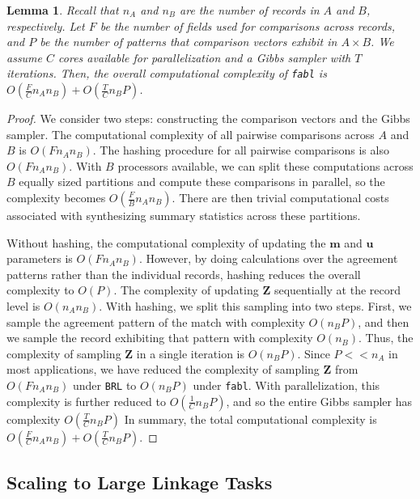 \documentclass[ba]{imsart}
\newtheorem{lemma}{Lemma}
\begin{document}
\begin{lemma}
	Recall that $n_A$ and $n_B$ are the number of records in $A$ and $B$, respectively. Let $F$ be the number of fields used for comparisons across records, and $P$ be the number of patterns that comparison vectors exhibit in $A \times B$. We assume $C$ cores available for parallelization and a Gibbs sampler with $T$ iterations. Then, the overall computational complexity of \texttt{fabl} is $O(\frac{F}{C} n_A n_B) + O(\frac{T}{C}n_B P)$.
	\label{lemma:fabl}
\end{lemma}
\begin{proof}
	We consider two steps: constructing the comparison vectors and the Gibbs sampler. The computational complexity of all pairwise comparisons across $A$ and $B$ is $O(F n_A n_B)$. The hashing procedure for all pairwise comparisons is also $O(F n_A n_B)$. With $B$ processors available, we can split these computations across $B$ equally sized partitions and compute these comparisons in parallel, so the complexity becomes $O(\frac{F}{B} n_A n_B)$. There are then trivial computational costs associated with synthesizing summary statistics across these partitions. 
	
	Without hashing, the computational complexity of updating the $\bm{m}$ and $\bm{u}$ parameters is $O(F n_A n_B)$. However, by doing calculations over the agreement patterns rather than the individual records, hashing reduces the overall complexity to $O(P)$. The complexity of updating $\bm{Z}$ sequentially at the record level is $O(n_A n_B)$. With hashing, we split this sampling into two steps. First, we sample the agreement pattern of the match with complexity $O(n_B P)$, and then we sample the record exhibiting that pattern with complexity $O(n_B)$. Thus, the complexity of sampling $\bm{Z}$ in a single iteration is $O(n_B P)$. Since $P << n_A$ in most applications, we have reduced the complexity of sampling $\bm{Z}$ from $O(F n_A n_B)$ under \texttt{BRL} to $O(n_B P)$ under \texttt{fabl}. With parallelization, this complexity is further reduced to $O(\frac{1}{C}n_B P)$, and so the entire Gibbs sampler has complexity $O(\frac{T}{C}n_B P)$
	In summary, the total computational complexity is $O(\frac{F}{C} n_A n_B) + O(\frac{T}{C}n_B P).$
\end{proof} 

\hypertarget{scaling}{%
	\subsection{Scaling to Large Linkage Tasks}\label{scaling}}
\end{document}
